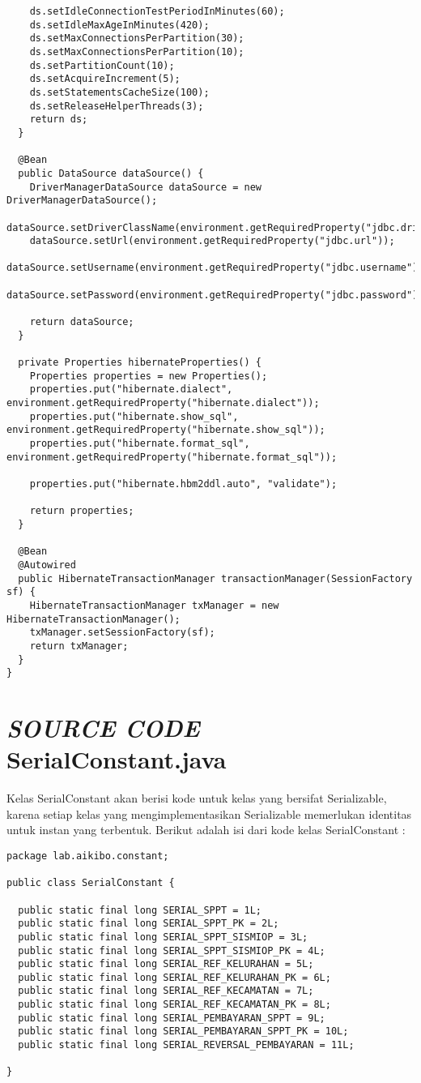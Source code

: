 \documentclass[pdftex,12pt, oneside]{article}
\begin{document}
\begin{lstlisting}
    ds.setIdleConnectionTestPeriodInMinutes(60);
    ds.setIdleMaxAgeInMinutes(420);
    ds.setMaxConnectionsPerPartition(30);
    ds.setMaxConnectionsPerPartition(10);
    ds.setPartitionCount(10);
    ds.setAcquireIncrement(5);
    ds.setStatementsCacheSize(100);
    ds.setReleaseHelperThreads(3);
    return ds;
  }

  @Bean
  public DataSource dataSource() {
    DriverManagerDataSource dataSource = new DriverManagerDataSource();
    dataSource.setDriverClassName(environment.getRequiredProperty("jdbc.driverClassName"));
    dataSource.setUrl(environment.getRequiredProperty("jdbc.url"));
    dataSource.setUsername(environment.getRequiredProperty("jdbc.username"));
    dataSource.setPassword(environment.getRequiredProperty("jdbc.password"));

    return dataSource;
  }

  private Properties hibernateProperties() {
    Properties properties = new Properties();
    properties.put("hibernate.dialect", environment.getRequiredProperty("hibernate.dialect"));
    properties.put("hibernate.show_sql", environment.getRequiredProperty("hibernate.show_sql"));
    properties.put("hibernate.format_sql", environment.getRequiredProperty("hibernate.format_sql"));

    properties.put("hibernate.hbm2ddl.auto", "validate");

    return properties;
  }

  @Bean
  @Autowired
  public HibernateTransactionManager transactionManager(SessionFactory sf) {
    HibernateTransactionManager txManager = new HibernateTransactionManager();
    txManager.setSessionFactory(sf);
    return txManager;
  }
}
\end{lstlisting}

\section{\textit{SOURCE CODE} SerialConstant.java}

Kelas SerialConstant akan berisi kode untuk kelas yang bersifat Serializable, karena setiap kelas yang mengimplementasikan Serializable memerlukan identitas untuk instan yang terbentuk. Berikut adalah isi dari kode kelas SerialConstant :

\begin{lstlisting}
package lab.aikibo.constant;

public class SerialConstant {

  public static final long SERIAL_SPPT = 1L;
  public static final long SERIAL_SPPT_PK = 2L;
  public static final long SERIAL_SPPT_SISMIOP = 3L;
  public static final long SERIAL_SPPT_SISMIOP_PK = 4L;
  public static final long SERIAL_REF_KELURAHAN = 5L;
  public static final long SERIAL_REF_KELURAHAN_PK = 6L;
  public static final long SERIAL_REF_KECAMATAN = 7L;
  public static final long SERIAL_REF_KECAMATAN_PK = 8L;
  public static final long SERIAL_PEMBAYARAN_SPPT = 9L;
  public static final long SERIAL_PEMBAYARAN_SPPT_PK = 10L;
  public static final long SERIAL_REVERSAL_PEMBAYARAN = 11L;

}
\end{lstlisting}
\end{document}
